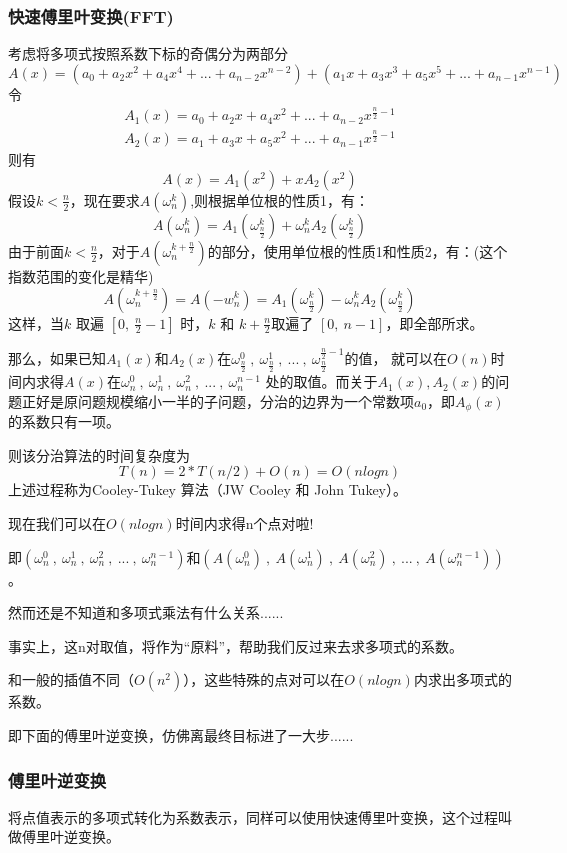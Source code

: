 \subsubsection{快速傅里叶变换(FFT)}
考虑将多项式按照系数下标的奇偶分为两部分
$$
A(x)=(a_0+a_2x^2+a_4x^4+...+a_{n-2}x^{n-2})+(a_1x+a_3x^3+a_5x^5+...+a_{n-1}x^{n-1})
$$
令
\begin{align*}
A_1(x)=a_0+a_2x+a_4x^2+...+a_{n-2}x^{\frac{n}{2}-1}  \\
A_2(x)=a_1+a_3x+a_5x^2+...+a_{n-1}x^{\frac{n}{2}-1}
\end{align*}
则有
$$
A(x)=A_1(x^2)+xA_2(x^2)
$$
假设$k<\frac{n}{2}$，现在要求$A(\omega_n^k)$,则根据单位根的性质1，有：
$$
A(\omega_n^k)=A_1(\omega_\frac{n}{2}^{k})+\omega_n^kA_2(\omega_\frac{n}{2}^{k})
$$
由于前面$k<\frac{n}{2}$，对于$A(\omega_n^{k+\frac{n}{2}})$的部分，使用单位根的性质1和性质2，有：(这个指数范围的变化是精华)
$$
A(\omega_n^{k+\frac{n}{2}})=A(-w_n^k)=A_1(\omega_\frac{n}{2}^{k})-\omega_n^kA_2(\omega_\frac{n}{2}^{k})
$$
这样，当$ k$ 取遍 $[0,\ \frac{n}{2}-1]$ 时，$k$ 和 $k + \frac{n}{2}$取遍了 $[0,\ n-1]$，即全部所求。

那么，如果已知$A_1(x)$和$A_2(x)$在$\omega_\frac{n}{2}^0\ ,\ \omega_\frac{n}{2}^1\ ,\ ...\ ,\ \omega_\frac{n}{2}^{\frac{n}{2}-1}$的值，
就可以在$O(n)$时间内求得$A(x)$在$\omega_n^0\ ,\ \omega_n^1\ ,\ \omega_n^2\ ,\ ...\ ,\ \omega_n^{n-1}$ 处的取值。而{\heiti 关于$A_1(x),A_2(x)$的问题正好是原问题规模缩小一半的子问题}，分治的边界为一个常数项$a_0$，即$A_\phi(x)$的系数只有一项。

则该分治算法的时间复杂度为
$$
T(n)=2*T(n/2)+O(n)=O(nlogn)
$$
上述过程称为{\heiti Cooley-Tukey 算法（JW Cooley 和 John Tukey）}。

{\heiti 现在我们可以在$O(nlogn)$时间内求得n个点对啦!}

即$(\omega_n^0\ ,\ \omega_n^1\ ,\ \omega_n^2\ ,\ ...\ ,\ \omega_n^{n-1})$和$(A(\omega_n^0)\ ,\ A(\omega_n^1)\ ,\ A(\omega_n^2)\ ,\ ...\ ,\ A(\omega_n^{n-1}))$。

然而还是不知道和多项式乘法有什么关系......

事实上，这n对取值，将作为“原料”，帮助我们{\heiti 反过来去求多项式的系数}。

和一般的插值不同（$O(n^2)$），{\heiti 这些特殊的点对可以在$O(nlogn)$内求出多项式的系数}。

即下面的傅里叶逆变换，仿佛离最终目标进了一大步......

\subsubsection{傅里叶逆变换}
将点值表示的多项式转化为系数表示，同样可以使用快速傅里叶变换，这个过程叫做{\heiti 傅里叶逆变换}。

